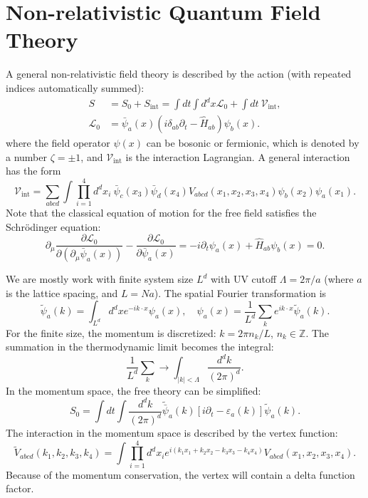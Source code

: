 \chapter{Non-relativistic Quantum Field Theory}
A general non-relativistic field theory is described by the action (with repeated indices automatically summed):
\begin{equation}
\begin{aligned}
	S &= S_0 + S_{\mathrm{int}} = \int dt \int d^d x \mathcal{L}_0 + \int dt\ \mathcal{V}_{\mathrm{int}}, \\
	\mathcal{L}_0 &= \bar\psi_a(x) (i\delta_{ab}\partial_t-\hat H_{ab})\psi_b(x).
\end{aligned}
\end{equation}
where the field operator $\psi(x)$ can be bosonic or fermionic, which is denoted by a number $\zeta=\pm 1$, and $\mathcal{V}_{\mathrm{int}}$ is the interaction Lagrangian.
A general interaction has the form
\begin{equation}
	\mathcal{V}_{\mathrm{int}} = \sum_{abcd}\int \prod_{i=1}^4 d^d x_i \ \bar\psi_{c}(x_3)\bar\psi_{d}(x_4) V_{abcd}(x_1,x_2,x_3,x_4) \psi_{b}(x_2)\psi_{a}(x_1).
\end{equation}
Note that the classical equation of motion for the free field satisfies the Schr\"{o}dinger equation:
\begin{equation}
	\partial_\mu \frac{\partial \mathcal L_0}{\partial(\partial_\mu \bar\psi_a(x))} - \frac{\partial \mathcal L_0}{\partial\bar{\psi}_a(x)} 
	= - i\partial_t \psi_a(x) + \hat H_{ab}\psi_b(x) = 0.
\end{equation}

We are mostly work with finite system size $L^d$ with UV cutoff $\Lambda = 2\pi/a$ (where $a$ is the lattice spacing, and $L = Na$). The spatial Fourier transformation is
\begin{equation}
	\tilde{\psi}_a(k) = \int_{L^d} d^dx e^{-i k \cdot x}\psi_a(x), \quad
	\psi_a(x) = \frac{1}{L^d}\sum_{k} e^{i k \cdot x}\tilde{\psi}_a(k).
\end{equation}
For the finite size, the momentum is discretized: $k = 2\pi n_k/L$, $n_k \in \mathbb Z$.
The summation in the thermodynamic limit becomes the integral:
\begin{equation}
	\frac{1}{L^d}\sum_k \longrightarrow \int_{|k|<\Lambda} \frac{d^dk}{(2\pi)^d}.
\end{equation}
In the momentum space, the free theory can be simplified:
\begin{equation}
	S_0 = \int dt \int \frac{d^d k}{(2\pi)^d} \tilde{\bar\psi}_a(k) [i\partial_t-\varepsilon_a(k)]\tilde{\psi}_a(k).
\end{equation}
The interaction in the momentum space is described by the vertex function:
\begin{equation}
	\tilde V_{abcd}(k_1,k_2,k_3,k_4)
	= \int \prod_{i=1}^4 d^d x_i e^{i(k_1x_1+k_2x_2-k_3x_3-k_4x_4)} V_{abcd}(x_1,x_2,x_3,x_4).
\end{equation}
Because of the momentum conservation, the vertex will contain a delta function factor.

